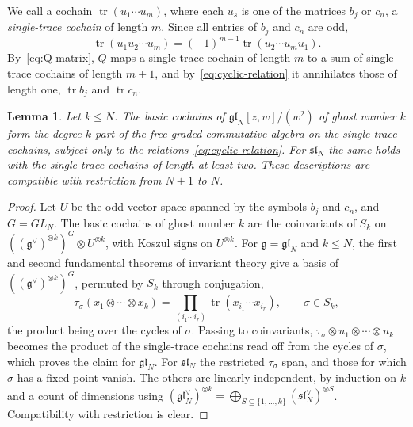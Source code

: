 \documentclass[11pt]{amsart}
\numberwithin{equation}{section}
\newtheorem{lemma}[theorem]{Lemma}
\theoremstyle{definition}
\theoremstyle{remark}
\newcommand{\g}{\mathfrak{g}}
\begin{document}
We call a cochain $\operatorname{tr}(u_1\cdots u_m)$, where each $u_s$ is one of the matrices $b_j$ or $c_n$, a \emph{single-trace cochain} of length $m$. Since all entries of $b_j$ and $c_n$ are odd,
\begin{equation}\label{eq:cyclic-relation}
\operatorname{tr}(u_1u_2\cdots u_m)=(-1)^{m-1}\operatorname{tr}(u_2\cdots u_mu_1).
\end{equation}
By~\eqref{eq:Q-matrix}, $Q$ maps a single-trace cochain of length $m$ to a sum of single-trace cochains of length $m+1$, and by~\eqref{eq:cyclic-relation} it annihilates those of length one, $\operatorname{tr}b_j$ and $\operatorname{tr}c_n$.

\begin{lemma}\label{lem:invariants}
Let $k\le N$. The basic cochains of $\mathfrak{gl}_N[z,w]/(w^2)$ of ghost number $k$ form the degree $k$ part of the free graded-commutative algebra on the single-trace cochains, subject only to the relations~\eqref{eq:cyclic-relation}. For $\mathfrak{sl}_N$ the same holds with the single-trace cochains of length at least two. These descriptions are compatible with restriction from $N+1$ to $N$.
\end{lemma}

\begin{proof}
Let $U$ be the odd vector space spanned by the symbols $b_j$ and $c_n$, and $G=GL_N$. The basic cochains of ghost number $k$ are the coinvariants of $S_k$ on $((\g^\vee)^{\otimes k})^G\otimes U^{\otimes k}$, with Koszul signs on $U^{\otimes k}$. For $\g=\mathfrak{gl}_N$ and $k\le N$, the first and second fundamental theorems of invariant theory \cite{Pro76} give a basis of $((\g^\vee)^{\otimes k})^G$, permuted by $S_k$ through conjugation,
\begin{equation}\label{eq:tau-sigma}
\tau_\sigma(x_1\otimes\cdots\otimes x_k)=\prod_{(i_1\cdots i_r)}\operatorname{tr}(x_{i_1}\cdots x_{i_r}),\qquad\sigma\in S_k,
\end{equation}
the product being over the cycles of $\sigma$. Passing to coinvariants, $\tau_\sigma\otimes u_1\otimes\cdots\otimes u_k$ becomes the product of the single-trace cochains read off from the cycles of $\sigma$, which proves the claim for $\mathfrak{gl}_N$. For $\mathfrak{sl}_N$ the restricted $\tau_\sigma$ span, and those for which $\sigma$ has a fixed point vanish. The others are linearly independent, by induction on $k$ and a count of dimensions using $(\mathfrak{gl}_N^\vee)^{\otimes k}=\bigoplus_{S\subseteq\{1,\dots,k\}}(\mathfrak{sl}_N^\vee)^{\otimes S}$. Compatibility with restriction is clear.
\end{proof}
\end{document}
